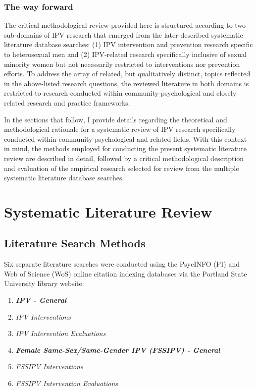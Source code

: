 \documentclass[11pt,]{tufte-book}
\providecommand{\tightlist}{%
  \setlength{\itemsep}{0pt}\setlength{\parskip}{0pt}}
\begin{document}
\section{The way forward}\label{the-way-forward}

The critical methodological review provided here is structured according
to two sub-domains of IPV research that emerged from the later-described
systematic literature database searches: (1) IPV intervention and
prevention research specific to heterosexual men and (2) IPV-related
research specifically inclusive of sexual minority women but not
necessarily restricted to interventions nor prevention efforts. To
address the array of related, but qualitatively distinct, topics
reflected in the above-listed research questions, the reviewed
literature in both domains is restricted to research conducted within
community-psychological and closely related research and practice
frameworks.

In the sections that follow, I provide details regarding the theoretical
and methodological rationale for a systematic review of IPV research
specifically conducted within community-psychological and related
fields. With this context in mind, the methods employed for conducting
the present systematic literature review are described in detail,
followed by a critical methodological description and evaluation of the
empirical research selected for review from the multiple systematic
literature database searches.

\part{Systematic Literature Review}

\chapter{Literature Search Methods}\label{literature-search-methods}

Six separate literature searches were conducted using the PsycINFO (PI)
and Web of Science (WoS) online citation indexing databases via the
Portland State University library website:

\begin{enumerate}
\def\labelenumi{\arabic{enumi}.}
\tightlist
\item
  \emph{\textbf{IPV - General}}
\item
  \emph{IPV Interventions}
\item
  \emph{IPV Intervention Evaluations}
\item
  \emph{\textbf{Female Same-Sex/Same-Gender IPV (FSSIPV) - General}}
\item
  \emph{FSSIPV Interventions}
\item
  \emph{FSSIPV Intervention Evaluations}
\end{enumerate}
\end{document}
